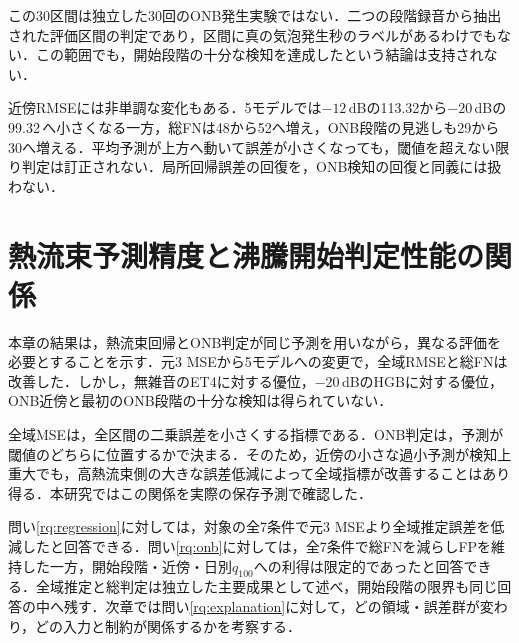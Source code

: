 \begin{table}[htbp]
\centering\small
\caption{5モデル統合の記録上ONB段階における判定．2 WAVから各15評価区間，計30区間．}
\label{tab:onset}

\end{table}

この30区間は独立した30回のONB発生実験ではない．二つの段階録音から抽出された評価区間の判定であり，区間に真の気泡発生秒のラベルがあるわけでもない．この範囲でも，開始段階の十分な検知を達成したという結論は支持されない．

近傍RMSEには非単調な変化もある．5モデルでは$-12$\,dBの113.32から$-20$\,dBの99.32\,\kw{}へ小さくなる一方，総FNは48から52へ増え，ONB段階の見逃しも29から30へ増える．平均予測が上方へ動いて誤差が小さくなっても，閾値を超えない限り判定は訂正されない．局所回帰誤差の回復を，ONB検知の回復と同義には扱わない．

\section{熱流束予測精度と沸騰開始判定性能の関係}
本章の結果は，熱流束回帰とONB判定が同じ予測を用いながら，異なる評価を必要とすることを示す．元3 MSEから5モデルへの変更で，全域RMSEと総FNは改善した．しかし，無雑音のET4に対する優位，$-20$\,dBのHGBに対する優位，ONB近傍と最初のONB段階の十分な検知は得られていない．

全域MSEは，全区間の二乗誤差を小さくする指標である．ONB判定は，予測が閾値のどちらに位置するかで決まる．そのため，近傍の小さな過小予測が検知上重大でも，高熱流束側の大きな誤差低減によって全域指標が改善することはあり得る．本研究ではこの関係を実際の保存予測で確認した．

問い\ref{rq:regression}に対しては，対象の全7条件で元3 MSEより全域推定誤差を低減したと回答できる．問い\ref{rq:onb}に対しては，全7条件で総FNを減らしFPを維持した一方，開始段階・近傍・日別$q_{100}$への利得は限定的であったと回答できる．全域推定と総判定は独立した主要成果として述べ，開始段階の限界も同じ回答の中へ残す．次章では問い\ref{rq:explanation}に対して，どの領域・誤差群が変わり，どの入力と制約が関係するかを考察する．
